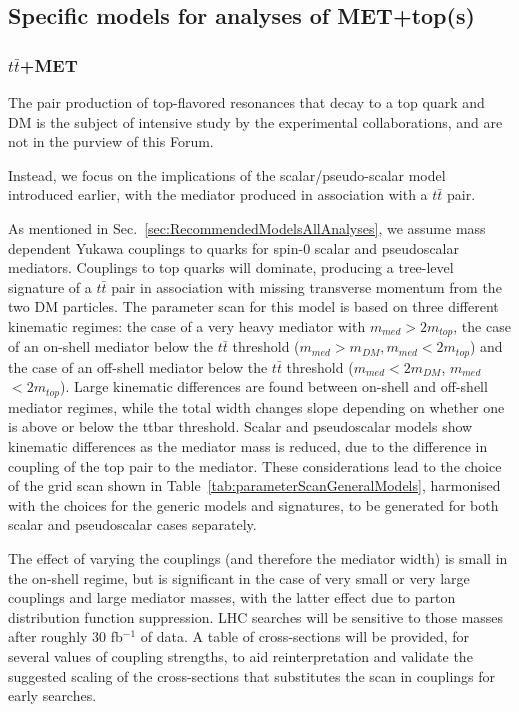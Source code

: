 \documentclass[a4,debug,notitlepage,nobib]{tufte-handout}
\newcommand{\mdm}{\ensuremath{m_{DM}}\xspace}
\newcommand{\mmed}{\ensuremath{m_{med}}\xspace}
\begin{document}
\subsection{Specific models for analyses of MET+top(s)}
\label{sub:SPttbar}

\subsubsection{$t \bar{t}$+MET}

The pair production of top-flavored resonances that decay to
a top quark and DM is the subject of intensive study by the
experimental collaborations, and are not in the purview of this Forum.

Instead, we focus on the implications of the scalar/pseudo-scalar
model introduced earlier, with the mediator produced in association
with a $t\bar t$ pair.

As mentioned in Sec.~\ref{sec:RecommendedModelsAllAnalyses}, we assume 
mass dependent Yukawa couplings to quarks for spin-$0$ scalar
and pseudoscalar mediators. Couplings to top quarks will dominate, 
producing a tree-level signature of a $t \bar{t}$ pair
in association with missing transverse momentum from the two DM particles.
The parameter scan for this model is based on three different kinematic
regimes: the case of a very heavy mediator with \mmed $> 2 m_{top}$, 
the case of an on-shell mediator below the $t\bar{t}$ threshold
($\mmed >  \mdm, \mmed < 2 m_{top}$) and the case of an off-shell mediator below
the $t\bar{t}$ threshold (\mmed $< 2 m_{DM}$, \mmed $< 2 m_{top}$). 
Large kinematic differences are found between on-shell and off-shell mediator
regimes, while the total width changes slope depending on whether one
is above or below the ttbar threshold. 
Scalar and pseudoscalar models show kinematic differences as the mediator mass 
is reduced, due to the difference in coupling of the top pair to the mediator. 
These considerations lead to the choice of the grid scan shown in 
Table~\ref{tab:parameterScanGeneralModels}, harmonised with the choices for
the generic models and signatures, to be generated for both scalar and pseudoscalar
cases separately.

The effect of varying the couplings (and therefore the mediator width) 
is small in the on-shell regime, but is significant in the case of
very small or very large couplings and large mediator masses, 
with the latter effect due to parton distribution function suppression. 
LHC searches will be sensitive to those masses after roughly 30 fb$^{-1}$ of data. 
A table of cross-sections will be provided, for several values of coupling strengths,
to aid reinterpretation and validate the suggested scaling of the cross-sections
that substitutes the scan in couplings for early searches. 
\end{document}

